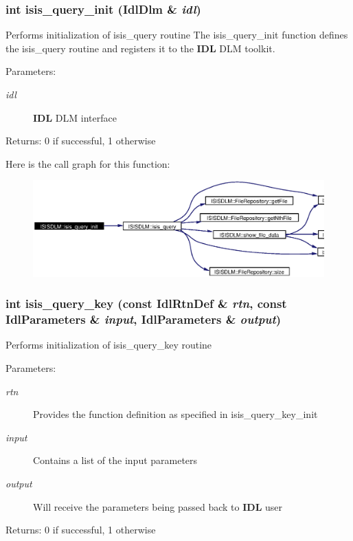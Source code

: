 \subsubsection{\setlength{\rightskip}{0pt plus 5cm}int isis\_\-query\_\-init (Idl\-Dlm \& {\em idl})}\label{namespaceISISDLM_a21}


Performs initialization of isis\_\-query routine The isis\_\-query\_\-init function defines the isis\_\-query routine and registers it to the {\bf IDL} DLM toolkit. \begin{Desc}
\item[Parameters:]
\begin{description}
\item[{\em idl}]{\bf IDL} DLM interface \end{description}
\end{Desc}
\begin{Desc}
\item[Returns:]0 if successful, 1 otherwise \end{Desc}


Here is the call graph for this function:\begin{figure}[H]
\begin{center}
\leavevmode
\includegraphics[width=351pt]{namespaceISISDLM_a21_cgraph}
\end{center}
\end{figure}
\subsubsection{\setlength{\rightskip}{0pt plus 5cm}int isis\_\-query\_\-key (const Idl\-Rtn\-Def \& {\em rtn}, const Idl\-Parameters \& {\em input}, Idl\-Parameters \& {\em output})}\label{namespaceISISDLM_a25}


Performs initialization of isis\_\-query\_\-key routine \begin{Desc}
\item[Parameters:]
\begin{description}
\item[{\em rtn}]Provides the function definition as specified in isis\_\-query\_\-key\_\-init \item[{\em input}]Contains a list of the input parameters \item[{\em output}]Will receive the parameters being passed back to {\bf IDL} user \end{description}
\end{Desc}
\begin{Desc}
\item[Returns:]0 if successful, 1 otherwise \end{Desc}


